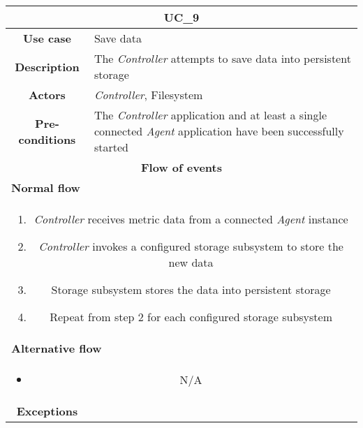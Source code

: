             \vspace{0.5cm}
            \noindent
            \begin{longtable}{ |c|p{11.8cm}| }
                \hline
                \multicolumn{2}{|c|}{\cellcolor{lime} \textbf{UC\_9}}\\ \hline
                \cellcolor[gray]{0.9} \textbf{Use case} & Save data\\ \hline
                \cellcolor[gray]{0.9} \textbf{Description} & The \textit{Controller} attempts to save data into persistent storage\\ \hline
                \cellcolor[gray]{0.9} \textbf{Actors} & \textit{Controller}, Filesystem\\ \hline
                \cellcolor[gray]{0.9} \textbf{Pre-conditions} & The \textit{Controller} application and at least a single connected \textit{Agent} application have been successfully started\\ \hline
                \multicolumn{2}{|c|}{\cellcolor[gray]{0.9} \textbf{Flow of events}}\\ \hline
                \multicolumn{2}{|l|}{\cellcolor[gray]{0.9} \textbf{Normal flow}}\\ \hline
                \multicolumn{2}{|p{14cm}|}{
                    \begin{enumerate}
                        \item \textit{Controller} receives metric data from a connected \textit{Agent} instance
                        \item \textit{Controller} invokes a configured storage subsystem to store the new data
                        \item Storage subsystem stores the data into persistent storage
                        \item Repeat from step 2 for each configured storage subsystem
                    \end{enumerate}
                }\\ \hline
                \multicolumn{2}{|l|}{\cellcolor[gray]{0.9} \textbf{Alternative flow}}\\ \hline
                \multicolumn{2}{|p{14cm}|}{
                    \begin{itemize}
                        \item N/A
                    \end{itemize}
                }\\ \hline
                \cellcolor[gray]{0.9} \textbf{Exceptions} & 

\end{longtable}
